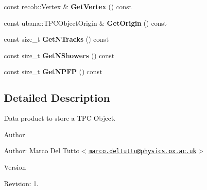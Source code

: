 \begin{DoxyCompactItemize}
\item 
\hypertarget{classubana_1_1TPCObject_a3845ae1b31ab6590c5597d157dc01e6a}{const recob\-::\-Vertex \& {\bfseries \-Get\-Vertex} () const }\label{classubana_1_1TPCObject_a3845ae1b31ab6590c5597d157dc01e6a}

\item 
\hypertarget{classubana_1_1TPCObject_a253b4e844b4de1333fa80263c03fceb7}{const ubana\-::\-T\-P\-C\-Object\-Origin \& {\bfseries \-Get\-Origin} () const }\label{classubana_1_1TPCObject_a253b4e844b4de1333fa80263c03fceb7}

\item 
\hypertarget{classubana_1_1TPCObject_af083d0e6577c431c1787eb46d313110b}{const size\-\_\-t {\bfseries \-Get\-N\-Tracks} () const }\label{classubana_1_1TPCObject_af083d0e6577c431c1787eb46d313110b}

\item 
\hypertarget{classubana_1_1TPCObject_a988b385655d32acd03121089058d49c4}{const size\-\_\-t {\bfseries \-Get\-N\-Showers} () const }\label{classubana_1_1TPCObject_a988b385655d32acd03121089058d49c4}

\item 
\hypertarget{classubana_1_1TPCObject_a5ec2d5ffe50fe31e05d5d1c4fd486df6}{const size\-\_\-t {\bfseries \-Get\-N\-P\-F\-P} () const }\label{classubana_1_1TPCObject_a5ec2d5ffe50fe31e05d5d1c4fd486df6}

\end{DoxyCompactItemize}


\subsection{\-Detailed \-Description}
\-Data product to store a \-T\-P\-C \-Object. 

\begin{DoxyAuthor}{\-Author}

\end{DoxyAuthor}
\begin{DoxyParagraph}{\-Author\-:}
\-Marco \-Del \-Tutto$<$\href{mailto:marco.deltutto@physics.ox.ac.uk}{\tt marco.\-deltutto@physics.\-ox.\-ac.\-uk}$>$ 
\end{DoxyParagraph}


\begin{DoxyVersion}{\-Version}

\end{DoxyVersion}
\begin{DoxyParagraph}{\-Revision\-:}
1. 
\end{DoxyParagraph}


